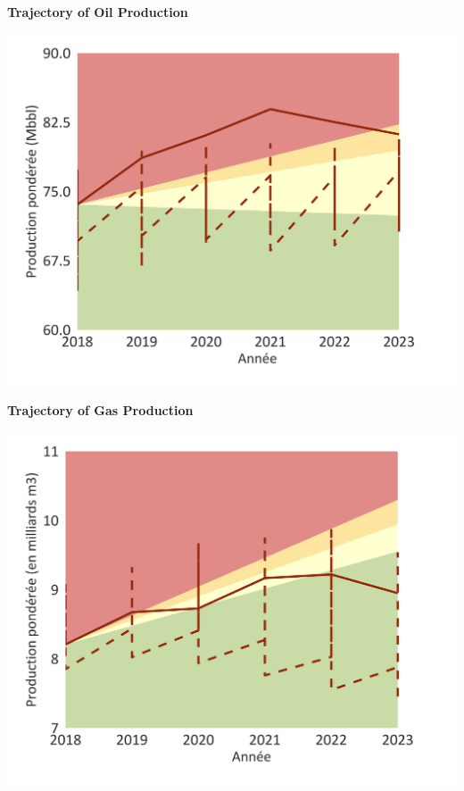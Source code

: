\documentclass[10pt,table]{article}\usepackage[]{graphicx}\usepackage[]{color}
\begin{document}
	\begin{minipage}[t]{.49\linewidth}
		\textbf{Trajectory of Oil Production }

		\includegraphics[trim = {0 0cm 0 0},width=1\linewidth]{ReportOutputs/Fig21}

	\end{minipage}	
	\hspace{.02\linewidth}
	\begin{minipage}[t]{.49\textwidth}
		\textbf{Trajectory of Gas Production }

		\includegraphics[trim = {0 0cm 0 0},width=1\linewidth]{ReportOutputs/Fig22}

	\end{minipage}
\end{document}
